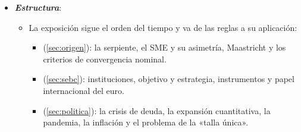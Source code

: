 \documentclass[11pt]{article}
\begin{document}
\begin{itemize}
\item \textbf{\emph{Estructura}}:
  \begin{itemize}
  \item La exposición sigue el orden del tiempo y va de las reglas a su aplicación:
    \begin{itemize}
    \item {} (\ref{sec:origen}): la serpiente, el SME y su asimetría, Maastricht y los criterios de convergencia nominal.
    \item {} (\ref{sec:sebc}): instituciones, objetivo y estrategia, instrumentos y papel internacional del euro.
    \item {} (\ref{sec:politica}): la crisis de deuda, la expansión cuantitativa, la pandemia, la inflación y el problema de la «talla única».
    \end{itemize}
  \end{itemize}
\end{itemize}
\end{document}
